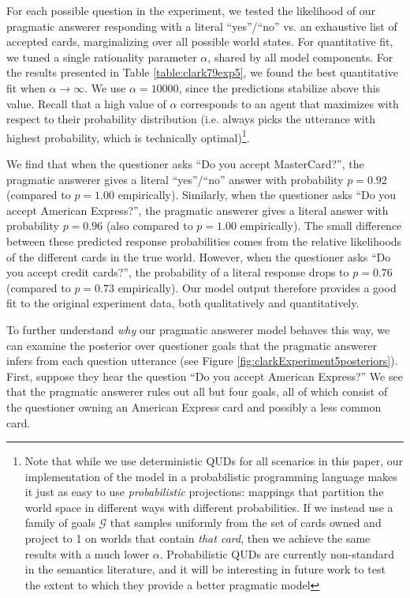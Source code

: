\documentclass[12pt, floatsintext, jou]{apa6}
\begin{document}
For each possible question in the experiment, we tested the likelihood of our pragmatic answerer responding with a literal ``yes''/``no'' vs. an exhaustive list of accepted cards, marginalizing over all possible world states. For quantitative fit, we tuned a single rationality parameter $\alpha$, shared by all model components. For the results presented in Table \ref{table:clark79exp5}, we found the best quantitative fit when $\alpha \rightarrow \infty$. We use $\alpha = 10000$, since the predictions stabilize above this value. Recall that a high value of $\alpha$ corresponds to an agent that maximizes with respect to their probability distribution (i.e. always picks the utterance with highest probability, which is technically optimal)\footnote{Note that while we use deterministic QUDs for all scenarios in this paper, our implementation of the model in a probabilistic programming language makes it just as easy to use \emph{probabilistic} projections: mappings that partition the world space in different ways with different probabilities. If we instead use a family of goals $\mathcal{G}$ that samples uniformly from the set of cards owned and project to 1 on worlds that contain \emph{that card}, then we achieve the same results with a much lower $\alpha$. Probabilistic QUDs are currently non-standard in the semantics literature, and it will be interesting in future work to test the extent to which they provide a better pragmatic model}. 

We find that when the questioner asks ``Do you accept MasterCard?'', the pragmatic answerer gives a literal ``yes''/``no'' answer with probability $p = 0.92$ (compared to $p=1.00$ empirically). Similarly, when the questioner asks ``Do you accept American Express?'', the pragmatic answerer gives a literal answer with probability $p = 0.96$ (also compared to $p=1.00$ empirically). The small difference between these predicted response probabilities comes from the relative likelihoods of the different cards in the true world. However, when the questioner asks ``Do you accept credit cards?'', the probability of a literal response drops to $p = 0.76$ (compared to $p=0.73$ empirically). Our model output therefore provides a good fit to the original experiment data, both qualitatively and quantitatively.

To further understand \emph{why} our pragmatic answerer model behaves this way, we can examine the posterior over questioner goals that the pragmatic answerer infers from each question utterance (see Figure \ref{fig:clarkExperiment5posteriors}). First, suppose they hear the question ``Do you accept American Express?'' We see that the pragmatic answerer rules out all but four goals, all of which consist of the questioner owning an American Express card and possibly a less common card. 
\end{document}
